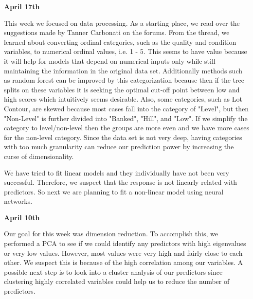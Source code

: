 \documentclass[12pt]{article}
\begin{document}

\textbf{April 17th}

This week we focused on data processing.  As a starting place, we read over the suggestions made by Tanner Carbonati on the forums.  From the thread, we learned about converting ordinal categories, such as the quality and condition variables, to numerical ordinal values, i.e. 1 - 5.  This seems to have value because it will help for models that depend on numerical inputs only while still maintaining the information in the original data set.  Additionally methods such as random forest can be improved by this categorization because then if the tree splits on these variables it is seeking the optimal cut-off point between low and high scores which intuitively seems desirable.  Also, some categories, such as Lot Contour, are skewed because most cases fall into the category of "Level", but then "Non-Level" is further divided into "Banked", "Hill", and "Low".  If we simplify the category to level/non-level then the groups are more even and we have more cases for the non-level category.  Since the data set is not very deep, having categories with too much granularity can reduce our prediction power by increasing the curse of dimensionality.  %

We have tried to fit linear models and they individually have not been very successful.  Therefore, we suspect that the response is not linearly related with predictors.  So next we are planning to fit a non-linear model using neural networks.

\textbf{April 10th}

Our goal for this week was dimension reduction.  To accomplish this, we performed a PCA to see if we could identify any predictors with high eigenvalues or very low values.  However, most values were very high and fairly close to each other.  We suspect this is because of the high correlation among our variables.  A possible next step is to look into a cluster analysis of our predictors since clustering highly correlated variables could help us to reduce the number of predictors.  %
\end{document}
